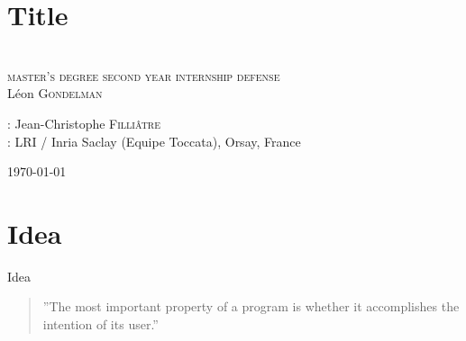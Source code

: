 \documentclass[xcolor=dvipsnames]{beamer}
\newcommand{\HRule}{\rule{\linewidth}{0.1mm}}
\begin{document}
\section*{Title}
\begin{frame}
\begin{center}


\textsc{}\\
 \textsc{ \scriptsize master's degree second year internship defense}\\[1cm]
L\'eon \textsc{Gondelman}\\[1.5cm]
\end{center}\bigskip

\begin{normalsize}
\begin{center} 
\hspace*{-9em}{\blue Supervisor}: Jean-Christophe \textsc{Filli\^atre} \\
\hspace*{1em}{\blue Laboratoire}: LRI / Inria Saclay (Equipe Toccata), Orsay, France \\
\end{center}
\end{normalsize}
\vfill\begin{center}
\today
\end{center} 






\end{frame}




\section*{Idea}
\begin{frame}{Idea}
\begin{quotation}
 ''The most important property of a program is whether it accomplishes the intention of its user.''\\
\hfill{}
\end{quotation}
\bigskip
\end{frame}
\end{document}

